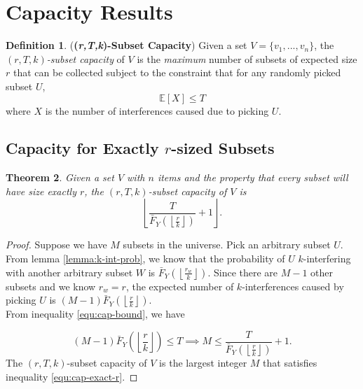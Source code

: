 \documentclass[10pt]{extarticle}
\newcommand{\E}{\mathbb{E}}
\newtheorem{theorem}{Theorem}
\theoremstyle{definition}
\newtheorem{definition}[theorem]{Definition}
\begin{document}
\section{Capacity Results}

\begin{definition} (\textbf{(\textit{r,T,k})-Subset Capacity}) Given a set $V = \{v_1,...,v_n\}$, the \textit{$(r,T,k)$-subset capacity} of $V$ is the \textit{maximum} number of subsets of expected size $r$ that can be collected subject to the constraint that for any randomly picked subset $U$, 
\begin{equation}
\label{equ:cap-bound}
    \E[X] \le T
\end{equation}
where $X$ is the number of interferences caused due to picking $U$. 
\end{definition}

\subsection{Capacity for Exactly $r$-sized Subsets}

\begin{theorem}
    Given a set $V$ with $n$ items and the property that every subset will have size exactly $r$, the $(r,T,k)$-subset capacity of $V$ is 
    \begin{equation*}
        \left\lfloor \frac{T}{\bar{F}_Y\left(\left\lfloor \frac{r}{k} \right\rfloor\right)} + 1 \right\rfloor.
    \end{equation*}
\end{theorem}

\begin{proof}
    Suppose we have $M$ subsets in the universe. Pick an arbitrary subset $U$. From lemma \ref{lemma:k-int-prob}, we know that the probability of $U$ $k$-interfering with another arbitrary subset $W$ is $\bar{F}_Y\left(\left\lfloor \frac{r_w}{k} \right\rfloor\right)$. Since there are $M-1$ other subsets and we know $r_w = r$, the expected number of $k$-interferences caused by picking $U$ is $(M-1) \bar{F}_Y\left(\left\lfloor \frac{r}{k} \right\rfloor\right)$. \\

\noindent From inequality \ref{equ:cap-bound}, we have 

    \begin{equation}
    \label{equ:cap-exact-r}
        (M-1) \bar{F}_Y\left(\left\lfloor \frac{r}{k} \right\rfloor\right) \le T \implies M \le \frac{T}{\bar{F}_Y\left(\left\lfloor \frac{r}{k} \right\rfloor\right)} + 1.
    \end{equation}
    The $(r,T,k)$-subset capacity of $V$ is the largest integer $M$ that satisfies inequality \ref{equ:cap-exact-r}.
\end{proof}
\end{document}
